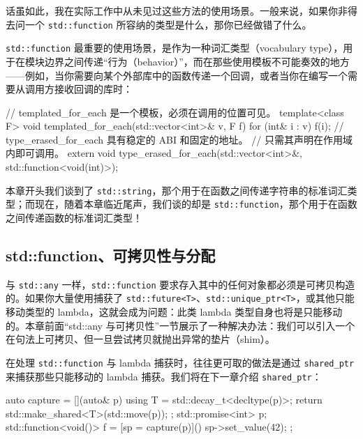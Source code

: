 话虽如此，我在实际工作中从未见过这些方法的使用场景。一般来说，如果你非得去问一个 \texttt{std::\allowbreak{}function} 所容纳的类型是什么，那你已经做错了什么。

\texttt{std::\allowbreak{}function} 最重要的使用场景，是作为一种词汇类型（vocabulary type），用于在模块边界之间传递“行为（behavior）”，而在那些使用模板不可能奏效的地方——例如，当你需要向某个外部库中的函数传递一个回调，或者当你在编写一个需要从调用方接收回调的库时：

\begin{codebox}[cpp]
    // templated_for_each 是一个模板，必须在调用的位置可见。
    template<class F>
    void templated_for_each(std::vector<int>& v, F f) {
      for (int& i : v) {
        f(i);
      }
    }
    // type_erased_for_each 具有稳定的 ABI 和固定的地址。
    // 只需其声明在作用域内即可调用。
    extern void type_erased_for_each(std::vector<int>&,
      std::function<void(int)>);
\end{codebox}

本章开头我们谈到了 \texttt{std::\allowbreak{}string}，那个用于在函数之间传递字符串的标准词汇类型；而现在，随着本章临近尾声，我们谈的却是 \texttt{std::\allowbreak{}function}，那个用于在函数之间传递函数的标准词汇类型！

\subsection{std::function、可拷贝性与分配}

与 \texttt{std::\allowbreak{}any} 一样，\texttt{std::\allowbreak{}function} 要求存入其中的任何对象都必须是可拷贝构造的。如果你大量使用捕获了 \texttt{std::\allowbreak{}future<\allowbreak{}T>\allowbreak{}}、\texttt{std::\allowbreak{}unique\_\allowbreak{}ptr<\allowbreak{}T>\allowbreak{}}，或其他只能移动类型的 lambda，这就会成为问题：此类 lambda 类型自身也将是只能移动的。本章前面“std::any 与可拷贝性”一节展示了一种解决办法：我们可以引入一个在句法上可拷贝、但一旦尝试拷贝就抛出异常的垫片（shim）。

在处理 \texttt{std::\allowbreak{}function} 与 lambda 捕获时，往往更可取的做法是通过 \texttt{shared\_\allowbreak{}ptr} 来捕获那些只能移动的 lambda 捕获。我们将在下一章介绍 \texttt{shared\_\allowbreak{}ptr}：

\begin{codebox}[cpp]
    auto capture = [](auto& p) {
      using T = std::decay_t<decltype(p)>;
      return std::make_shared<T>(std::move(p));
    };
   std::promise<int> p;
   std::function<void()> f = [sp = capture(p)]() {
     sp->set_value(42);
   };
\end{codebox}


